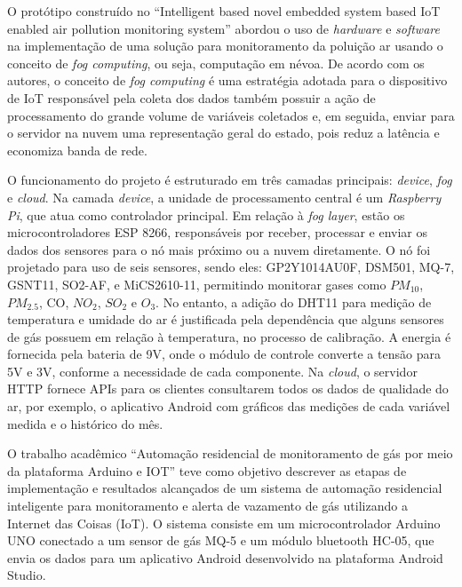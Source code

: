 O protótipo construído no ``Intelligent based novel embedded system based IoT enabled air
pollution monitoring system'' \cite{tbRelacionado4NovelEmbeddedSystem} abordou o uso de \textit{hardware} e \textit{software} na implementação 
de uma solução para monitoramento da poluição ar usando o conceito de \textit{fog computing}, ou seja, computação em névoa. De acordo com os autores, o conceito de 
\textit{fog computing} é uma estratégia adotada para o dispositivo de IoT responsável pela coleta dos dados também possuir a ação de processamento do grande volume de variáveis coletados e, 
em seguida, enviar para o servidor na nuvem uma representação geral do estado, pois reduz a latência e economiza banda de rede.

O funcionamento do projeto é estruturado em três camadas principais: \textit{device}, \textit{fog} e \textit{cloud}. Na camada \textit{device}, 
a unidade de processamento central é um \textit{Raspberry Pi}, que atua como controlador principal. Em relação à \textit{fog layer}, estão os microcontroladores ESP 8266, responsáveis por receber, processar e 
enviar os dados dos sensores para o nó mais próximo ou a nuvem diretamente. O nó foi projetado para uso de seis sensores, sendo eles: GP2Y1014AU0F, DSM501, MQ-7, GSNT11, SO2-AF,
e MiCS2610-11, permitindo monitorar gases como $PM_{10}$, ${PM_{2.5}}$, CO, $NO_{2}$, $SO_{2}$ e $O_{3}$. No entanto, a adição do DHT11 para medição de temperatura e umidade do ar é justificada 
pela dependência que alguns sensores de gás possuem em relação à temperatura, no processo de calibração. A energia é fornecida pela bateria de 9V, onde o módulo de controle converte a tensão para 5V e 3V, conforme a 
necessidade de cada componente. Na \textit{cloud}, o servidor HTTP fornece APIs para os clientes consultarem todos os dados de qualidade do ar, por exemplo, o aplicativo Android com 
gráficos das medições de cada variável medida e o histórico do mês.

O trabalho acadêmico ``Automação residencial de monitoramento de gás por meio da plataforma Arduino e IOT'' \cite{sistema-antivazamento} teve como objetivo descrever as etapas de implementação e resultados alcançados de um sistema de automação 
residencial inteligente para monitoramento e alerta de vazamento de gás utilizando a Internet das Coisas (IoT). O sistema consiste em um microcontrolador Arduino UNO 
conectado a um sensor de gás MQ-5 e um módulo bluetooth HC-05, que envia os dados para um aplicativo Android desenvolvido na plataforma Android Studio.

